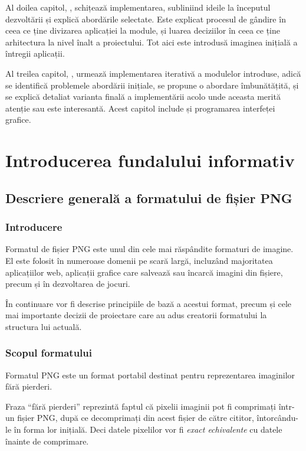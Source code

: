 \documentclass[a4paper,12pt]{report}
\begin{document}
Al doilea capitol, , schițează implementarea,
subliniind ideile la începutul dezvoltării și explică abordările selectate.
Este explicat procesul de gândire în ceea ce ține divizarea aplicației la module,
și luarea deciziilor în ceea ce ține arhitectura la nivel înalt a proiectului.
Tot aici este introdusă imaginea inițială a întregii aplicații.

Al treilea capitol, ,
urmează implementarea iterativă a modulelor introduse,
adică se identifică problemele abordării inițiale,
se propune o abordare îmbunătățită, și se explică detaliat varianta finală a implementării
acolo unde aceasta merită atenție sau este interesantă.
Acest capitol include și programarea interfeței grafice.

\chapter{Introducerea fundalului informativ}\label{intro_chapter_title}

\section{Descriere generală a formatului de fișier \acs{PNG}}

\subsection{Introducere}

Formatul de fișier \ac{PNG} este unul din cele mai răspândite formaturi de imagine.
El este folosit în numeroase domenii pe scară largă, incluzând majoritatea aplicațiilor
web, aplicații grafice care salvează sau încarcă imagini din fișiere, precum și în dezvoltarea de jocuri.

În continuare vor fi descrise principiile de bază a acestui format,
precum și cele mai importante decizii de proiectare care au adus creatorii formatului la structura lui actuală.

\subsection{Scopul formatului}

Formatul \ac{PNG} este un format portabil destinat pentru reprezentarea imaginilor fără pierderi.

Fraza ``fără pierderi'' reprezintă faptul că pixelii imaginii
pot fi comprimați într-un fișier \ac{PNG},
după ce decomprimați din acest fișier de către cititor,
întorcându-le în forma lor inițială.
Deci datele pixelilor vor fi \textit{exact echivalente} cu datele înainte de comprimare.
\end{document}
